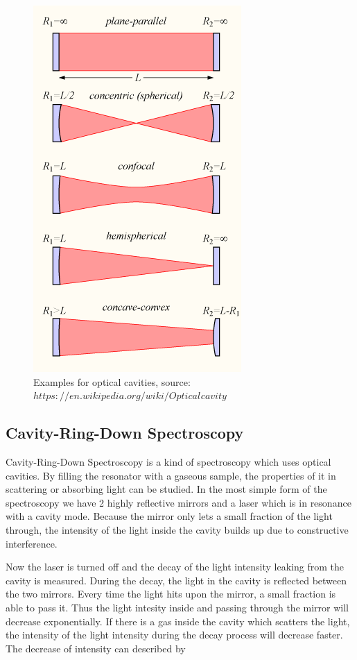 \documentclass[12pt,a4paper]{article}
\begin{document}
\begin{figure}[h]
	\includegraphics[scale = 0.5]{Optical-cavity1.png}
	\centering
	\caption{Examples for optical cavities, source: \href{https://en.wikipedia.org/wiki/Optical_cavity}{$https://en.wikipedia.org/wiki/Optical_{}cavity$}}
	\label{optical_cavities}
\end{figure}

\subsection{Cavity-Ring-Down Spectroscopy}

Cavity-Ring-Down Spectroscopy is a kind of spectroscopy which uses optical cavities. By filling the resonator with a gaseous sample, the properties of it in scattering or absorbing light can be studied. In the most simple form of the spectroscopy we have 2 highly reflective mirrors and a laser which is in resonance with a cavity mode. Because the mirror only lets a small fraction of the light through, the intensity of the light inside the cavity builds up due to constructive interference. 

Now the laser is turned off and the decay of the light intensity leaking from the cavity is measured. During the decay, the light in the cavity is reflected between the two mirrors. Every time the light hits upon the mirror, a small fraction is able to pass it. Thus the light intesity inside and passing through the mirror will decrease exponentially. If there is a gas inside the cavity which scatters the light, the intensity of the light intensity during the decay process will decrease faster. The decrease of intensity can described by
\end{document}
